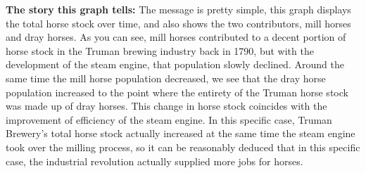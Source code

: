 

\textbf{The story this graph tells:} The message is pretty simple, this graph displays the total horse stock over time, and also shows the two contributors, mill horses and dray horses.  As you can see, mill horses contributed to a decent portion of horse stock in the Truman brewing industry back in 1790, but with the development of the steam engine, that population slowly declined.  Around the same time the mill horse population decreased, we see that the dray horse population increased to the point where the entirety of the Truman horse stock was made up of dray horses.  This change in horse stock coincides with the improvement of efficiency of the steam engine.  In this specific case, Truman Brewery's total horse stock actually increased at the same time the steam engine took over the milling process, so it can be reasonably deduced that in this specific case, the industrial revolution actually supplied more jobs for horses.